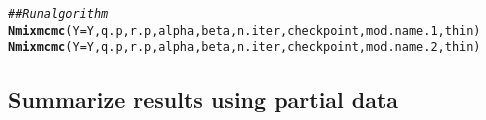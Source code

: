 \documentclass[12pt,letterpaper,final]{article}\usepackage[]{graphicx}\usepackage[]{color}
\makeatletter
\newcommand{\hlcom}[1]{\textcolor[rgb]{0.678,0.584,0.686}{\textit{#1}}}%
\newcommand{\hlstd}[1]{\textcolor[rgb]{0.345,0.345,0.345}{#1}}%
\newcommand{\hlkwc}[1]{\textcolor[rgb]{0.333,0.667,0.333}{#1}}%
\newcommand{\hlkwd}[1]{\textcolor[rgb]{0.737,0.353,0.396}{\textbf{#1}}}%
\newenvironment{kframe}{%
 \def\at@end@of@kframe{}%
 \ifinner\ifhmode%
  \def\at@end@of@kframe{\end{minipage}}%
  \begin{minipage}{\columnwidth}%
 \fi\fi%
 \def\FrameCommand##1{\hskip\@totalleftmargin \hskip-\fboxsep
 \colorbox{shadecolor}{##1}\hskip-\fboxsep
     \hskip-\linewidth \hskip-\@totalleftmargin \hskip\columnwidth}%
 \MakeFramed {\advance\hsize-\width
   \@totalleftmargin\z@ \linewidth\hsize
   \@setminipage}}%
 {\par\unskip\endMakeFramed%
 \at@end@of@kframe}
\newenvironment{knitrout}{}{} %
\makeatother
\begin{document}
\begin{knitrout}
\color{fgcolor}\begin{kframe}
\begin{alltt}
\hlcom{## Run algorithm}
\hlkwd{Nmixmcmc}\hlstd{(}\hlkwc{Y}\hlstd{=Y,q.p,r.p,alpha,beta,n.iter,checkpoint,mod.name.1,thin)}
\hlkwd{Nmixmcmc}\hlstd{(}\hlkwc{Y}\hlstd{=Y,q.p,r.p,alpha,beta,n.iter,checkpoint,mod.name.2,thin)}
\end{alltt}
\end{kframe}
\end{knitrout}


\subsection{Summarize results using partial data}
\end{document}
